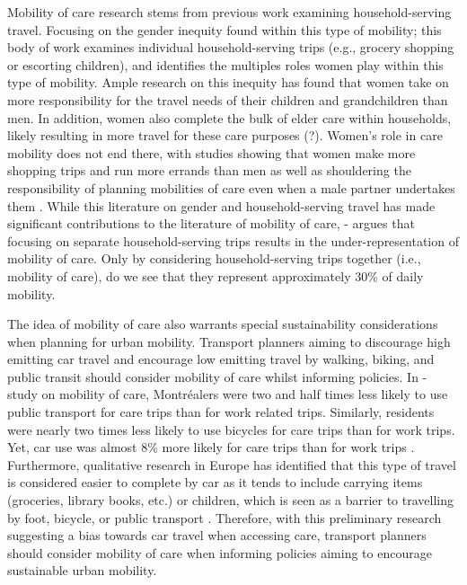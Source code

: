 \documentclass[
  super,
  preprint,
  3p]{elsarticle}
\begin{document}
Mobility of care research stems from previous work examining
household-serving travel. Focusing on the gender inequity found within
this type of mobility; this body of work examines individual
household-serving trips (e.g., grocery shopping or escorting children),
and identifies the multiples roles women play within this type of
mobility. Ample research on this inequity has found that women take on
more responsibility for the travel needs of their children
\citep{mauchGenderRaceTravel1997, craigGenderMobilityParental2019, taylorWhatExplainsGender2015, hanTaskAllocationGender2019, mcdonaldExploratoryAnalysisChildren2006}
and grandchildren \citep{plyushtevaCarerelatedJourneysLife2018} than
men. In addition, women also complete the bulk of elder care within
households, likely resulting in more travel for these care purposes
\citep{handyAccessibilityIdeaWhose2020} (?). Women's role in care
mobility does not end there, with studies showing that women make more
shopping trips and run more errands than men as well as shouldering the
responsibility of planning mobilities of care even when a male partner
undertakes them
\citep{taylorWhatExplainsGender2015, mcdonaldExploratoryAnalysisChildren2006, elgeneidyMakingAccessibilityWork2021, kelobonyeRelativeAccessibilityAnalysis2019, farberOntarioLineSocioeconomic2019}.
While this literature on gender and household-serving travel has made
significant contributions to the literature of mobility of care,
-\citet{sanchezdemadariagaMobilityCareIntroducing2013} argues that
focusing on separate household-serving trips results in the
under-representation of mobility of care. Only by considering
household-serving trips together (i.e., mobility of care), do we see
that they represent approximately 30\% of daily mobility.

The idea of mobility of care also warrants special sustainability
considerations when planning for urban mobility. Transport planners
aiming to discourage high emitting car travel and encourage low emitting
travel by walking, biking, and public transit should consider mobility
of care whilst informing policies. In
-\citet{ravensbergenExploratoryAnalysisMobility2022} study on mobility
of care, Montréalers were two and half times less likely to use public
transport for care trips than for work related trips. Similarly,
residents were nearly two times less likely to use bicycles for care
trips than for work trips. Yet, car use was almost 8\% more likely for
care trips than for work trips \citep{mauchGenderRaceTravel1997}.
Furthermore, qualitative research in Europe has identified that this
type of travel is considered easier to complete by car as it tends to
include carrying items (groceries, library books, etc.) or children,
which is seen as a barrier to travelling by foot, bicycle, or public
transport \citep{maciejewskaHaveChildrenThus2019}. Therefore, with this
preliminary research suggesting a bias towards car travel when accessing
care, transport planners should consider mobility of care when informing
policies aiming to encourage sustainable urban mobility.
\end{document}
